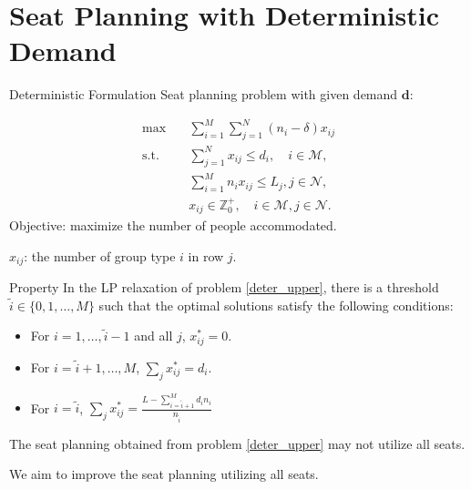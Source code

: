 
\section{Seat Planning with Deterministic Demand}
    \frame{\sectionpage}

  \begin{frame}{Deterministic Formulation}  %
    Seat planning problem with given demand $\bm{d}$:

    \begin{equation}\label{deter_upper}
      \begin{aligned}
      \max \quad & \sum_{i=1}^{M}  \sum_{j= 1}^{N} (n_i- \delta) x_{ij} \\
      \text {s.t.} \quad & \sum_{j= 1}^{N} x_{ij} \leq d_{i}, \quad i \in \mathcal{M}, \\
      & \sum_{i=1}^{M} n_{i} x_{ij} \leq L_j, j \in \mathcal{N}, \\
      & x_{ij} \in \mathbb{Z}^{+}_{0}, \quad i \in \mathcal{M}, j \in \mathcal{N}.
      \end{aligned}
    \end{equation}
    Objective: maximize the number of people accommodated.

    $x_{ij}$: the number of group type $i$ in row $j$.
  \end{frame}

  \begin{frame}{Property}
    In the LP relaxation of problem \eqref{deter_upper}, there is a threshold $\tilde{i} \in\{0,1,\ldots, M\}$ such that the optimal solutions satisfy the following conditions:

    \begin{itemize}
      \item For $i = 1,\ldots, \tilde{i} -1$ and all $j$, $x_{ij}^{*} = 0$. 
      \item For $i = \tilde{i} +1,\ldots, M$, $\sum_{j} x_{ij}^{*} = d_{i}$. 

      \item For $i = \tilde{i}$, $\sum_{j} x_{ij}^{*} = \frac{L - \sum_{i = \tilde{i}+1}^{M} {d_i n_i}}{n_{\tilde{i}}}$ 
    \end{itemize}

    \vspace{0.5cm}
    The seat planning obtained from problem \eqref{deter_upper} may not utilize all seats.

    \vspace{0.5cm}
    
    We aim to improve the seat planning utilizing all seats.

  \end{frame}

